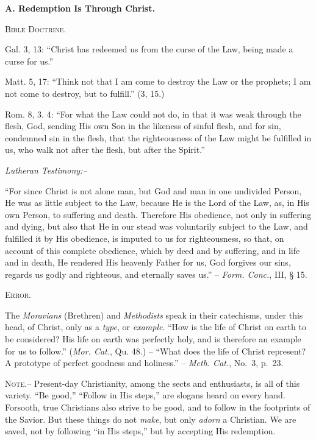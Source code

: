 \documentclass[
]{book}
\begin{document}
\begin{center}
\textbf{A.  Redemption Is Through Christ.}

\textsc{Bible Doctrine.}
\end{center}

Gal. 3, 13: ``Christ has redeemed us from the curse of the Law, being made a curse for us.''

Matt. 5, 17: ``Think not that I am come to destroy the Law or the prophets; I am not come to destroy, but to fulfill.'' (3, 15.)

Rom. 8, 3. 4: ``For what the Law could not do, in that it was weak through the flesh, God, sending His own Son in the likeness of sinful flesh, and for sin, condemned sin in the flesh, that the righteousness of the Law might be fulfilled in us, who walk not after the flesh, but after the Spirit.''

\begin{center}
\textsl{Lutheran Testimony:--}
\end{center}

``For since Christ is not alone man, but God and man in one undivided Person, He was as little subject to the Law, because He is the Lord of the Law, as, in His own Person, to suffering and death. Therefore His obedience, not only in suffering and dying, but also that He in our stead was voluntarily subject to the Law, and fulfilled it by His obedience, is imputed to us for righteousness, so that, on account of this complete obedience, which by deed and by suffering, and in life and in death, He rendered His heavenly Father for us, God forgives our sins, regards us godly and righteous, and eternally saves us.'' -- \emph{Form. Conc.}, III, § 15.

\begin{center}
\textsc{Error.}
\end{center}

The \emph{Moravians} (Brethren) and \emph{Methodists} speak in their catechisms, under this head, of Christ, only as a \emph{type}, or \emph{example}. ``How is the life of Christ on earth to be considered? His life on earth was perfectly holy, and is therefore an example for us to follow.'' (\emph{Mor. Cat.}, Qu. 48.) -- ``What does the life of Christ represent? A prototype of perfect goodness and holiness.'' -- \emph{Meth. Cat.}, No.~3, p.~23.

\textsc{Note.--} Present-day Christianity, among the sects and enthusiasts, is all of this variety. ``Be good,'' ``Follow in His steps,'' are slogans heard on every hand. Forsooth, true Christians also strive to be good, and to follow in the footprints of the Savior. But these things do not \emph{make}, but only \emph{adorn} a Christian. We are saved, not by following ``in His steps,'' but by accepting His redemption.
\end{document}
